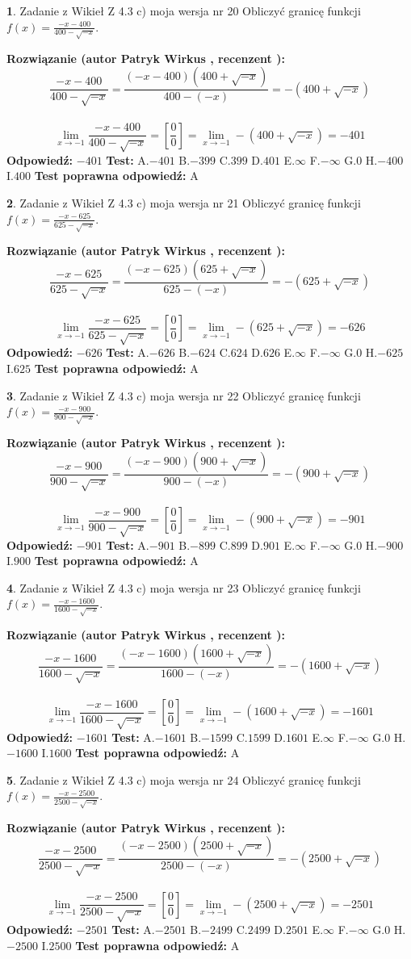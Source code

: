 \documentclass[12pt, a4paper]{article}
\theoremstyle{definition} %
\newtheorem{zad}{}
\newcommand{\zadStart}[1]{\begin{zad}#1\newline}
\newcommand{\zadStop}{\end{zad}}
\newcommand{\rozwStart}[2]{\noindent \textbf{Rozwiązanie (autor #1 , recenzent #2): }\newline}
\newcommand{\rozwStop}{\newline}
\newcommand{\odpStart}{\noindent \textbf{Odpowiedź:}\newline}
\newcommand{\odpStop}{\newline}
\newcommand{\testStart}{\noindent \textbf{Test:}\newline}
\newcommand{\testStop}{\newline}
\newcommand{\kluczStart}{\noindent \textbf{Test poprawna odpowiedź:}\newline}
\newcommand{\kluczStop}{\newline}
\begin{document}
\zadStart{Zadanie z Wikieł Z 4.3 c) moja wersja nr 20}
Obliczyć granicę funkcji $f(x)=\frac{-x-400}{400-\sqrt{-x}}$.
\zadStop
\rozwStart{Patryk Wirkus}{}
$$\frac{-x-400}{400-\sqrt{-x}}=\frac{(-x-400)(400+\sqrt{-x})}{400-(-x)}=-(400+\sqrt{-x})$$
\\
$$\lim\limits_{x\to-1}\frac{-x-400}{400-\sqrt{-x}}=[\frac{0}{0}]=\lim\limits_{x\to-1}-(400+\sqrt{-x}) =-401$$
\rozwStop
\odpStart
$-401$
\odpStop
\testStart
A.$-401$
B.$-399$
C.$399$
D.$401$
E.$\infty$
F.$-\infty$
G.$0$
H.$-400$
I.$400$
\testStop
\kluczStart
A
\kluczStop



\zadStart{Zadanie z Wikieł Z 4.3 c) moja wersja nr 21}
Obliczyć granicę funkcji $f(x)=\frac{-x-625}{625-\sqrt{-x}}$.
\zadStop
\rozwStart{Patryk Wirkus}{}
$$\frac{-x-625}{625-\sqrt{-x}}=\frac{(-x-625)(625+\sqrt{-x})}{625-(-x)}=-(625+\sqrt{-x})$$
\\
$$\lim\limits_{x\to-1}\frac{-x-625}{625-\sqrt{-x}}=[\frac{0}{0}]=\lim\limits_{x\to-1}-(625+\sqrt{-x}) =-626$$
\rozwStop
\odpStart
$-626$
\odpStop
\testStart
A.$-626$
B.$-624$
C.$624$
D.$626$
E.$\infty$
F.$-\infty$
G.$0$
H.$-625$
I.$625$
\testStop
\kluczStart
A
\kluczStop



\zadStart{Zadanie z Wikieł Z 4.3 c) moja wersja nr 22}
Obliczyć granicę funkcji $f(x)=\frac{-x-900}{900-\sqrt{-x}}$.
\zadStop
\rozwStart{Patryk Wirkus}{}
$$\frac{-x-900}{900-\sqrt{-x}}=\frac{(-x-900)(900+\sqrt{-x})}{900-(-x)}=-(900+\sqrt{-x})$$
\\
$$\lim\limits_{x\to-1}\frac{-x-900}{900-\sqrt{-x}}=[\frac{0}{0}]=\lim\limits_{x\to-1}-(900+\sqrt{-x}) =-901$$
\rozwStop
\odpStart
$-901$
\odpStop
\testStart
A.$-901$
B.$-899$
C.$899$
D.$901$
E.$\infty$
F.$-\infty$
G.$0$
H.$-900$
I.$900$
\testStop
\kluczStart
A
\kluczStop



\zadStart{Zadanie z Wikieł Z 4.3 c) moja wersja nr 23}
Obliczyć granicę funkcji $f(x)=\frac{-x-1600}{1600-\sqrt{-x}}$.
\zadStop
\rozwStart{Patryk Wirkus}{}
$$\frac{-x-1600}{1600-\sqrt{-x}}=\frac{(-x-1600)(1600+\sqrt{-x})}{1600-(-x)}=-(1600+\sqrt{-x})$$
\\
$$\lim\limits_{x\to-1}\frac{-x-1600}{1600-\sqrt{-x}}=[\frac{0}{0}]=\lim\limits_{x\to-1}-(1600+\sqrt{-x}) =-1601$$
\rozwStop
\odpStart
$-1601$
\odpStop
\testStart
A.$-1601$
B.$-1599$
C.$1599$
D.$1601$
E.$\infty$
F.$-\infty$
G.$0$
H.$-1600$
I.$1600$
\testStop
\kluczStart
A
\kluczStop



\zadStart{Zadanie z Wikieł Z 4.3 c) moja wersja nr 24}
Obliczyć granicę funkcji $f(x)=\frac{-x-2500}{2500-\sqrt{-x}}$.
\zadStop
\rozwStart{Patryk Wirkus}{}
$$\frac{-x-2500}{2500-\sqrt{-x}}=\frac{(-x-2500)(2500+\sqrt{-x})}{2500-(-x)}=-(2500+\sqrt{-x})$$
\\
$$\lim\limits_{x\to-1}\frac{-x-2500}{2500-\sqrt{-x}}=[\frac{0}{0}]=\lim\limits_{x\to-1}-(2500+\sqrt{-x}) =-2501$$
\rozwStop
\odpStart
$-2501$
\odpStop
\testStart
A.$-2501$
B.$-2499$
C.$2499$
D.$2501$
E.$\infty$
F.$-\infty$
G.$0$
H.$-2500$
I.$2500$
\testStop
\kluczStart
A
\kluczStop
\end{document}

